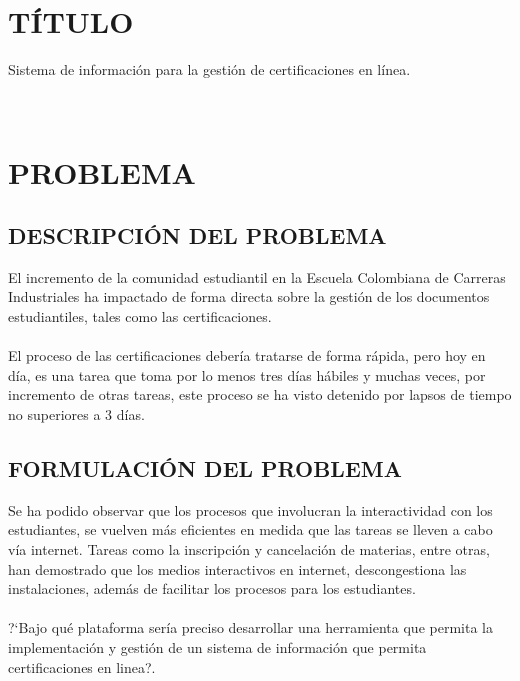 \chapter{T\'ITULO}
%
Sistema de informaci\'on para la gesti\'on de certificaciones en l\'inea.\\%
%
{\\\let\clearpage\relax\chapter{PROBLEMA}}
\section{DESCRIPCI\'ON DEL PROBLEMA}
%
El incremento de la comunidad estudiantil en la Escuela Colombiana de Carreras Industriales ha impactado de forma directa sobre la gesti\'on de los documentos estudiantiles, tales como las certificaciones.\\%
%
\\El proceso de las certificaciones deber\'ia tratarse de forma r\'apida, pero hoy en d\'ia, es una tarea que toma por lo menos tres d\'ias h\'abiles y muchas veces, por incremento de otras tareas, este proceso se ha visto detenido por lapsos de tiempo no superiores a 3 d\'ias.%
%
\section{FORMULACI\'ON DEL PROBLEMA}
%
Se ha podido observar que los procesos que involucran la interactividad con los estudiantes, se vuelven m\'as eficientes en medida que las tareas se lleven a cabo v\'ia internet. Tareas como la inscripci\'on y cancelaci\'on de materias, entre otras, han demostrado que los medios interactivos en internet, descongestiona las instalaciones, adem\'as de facilitar los procesos para los estudiantes.\\%
%
\\?`Bajo qu\'e plataforma ser\'ia preciso desarrollar una herramienta que permita la implementaci\'on y gesti\'on de un sistema de informaci\'on que permita certificaciones en linea?.%